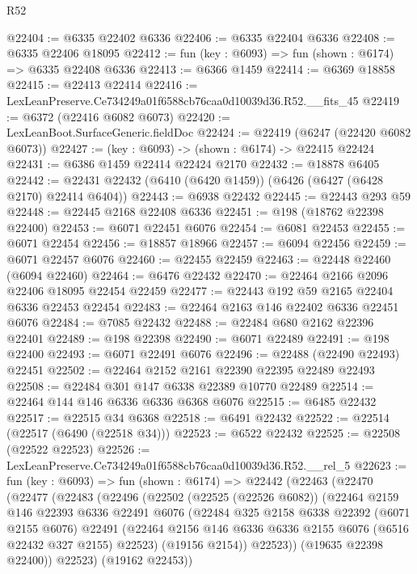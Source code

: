 \begin{lexlean}{R52}
\begin{coremodule}
@22404 := @6335 @22402 @6336
@22406 := @6335 @22404 @6336
@22408 := @6335 @22406 @18095
@22412 := fun (key : @6093) => fun (shown : @6174) => @6335 @22408 @6336
@22413 := @6366 @1459
@22414 := @6369 @18858
@22415 := @22413 @22414
@22416 := LexLeanPreserve.Ce734249a01f6588cb76caa0d10039d36.R52.__fits_45
@22419 := @6372 (@22416 @6082 @6073)
@22420 := LexLeanBoot.SurfaceGeneric.fieldDoc
@22424 := @22419 (@6247 (@22420 @6082 @6073))
@22427 := (key : @6093) -> (shown : @6174) -> @22415 @22424
@22431 := @6386 @1459 @22414 @22424 @2170
@22432 := @18878 @6405
@22442 := @22431 @22432 (@6410 (@6420 @1459)) (@6426 (@6427 (@6428 @2170) @22414 @6404))
@22443 := @6938 @22432
@22445 := @22443 @293 @59
@22448 := @22445 @2168 @22408 @6336
@22451 := @198 (@18762 @22398 @22400)
@22453 := @6071 @22451 @6076
@22454 := @6081 @22453
@22455 := @6071 @22454
@22456 := @18857 @18966
@22457 := @6094 @22456
@22459 := @6071 @22457 @6076
@22460 := @22455 @22459
@22463 := @22448 @22460 (@6094 @22460)
@22464 := @6476 @22432
@22470 := @22464 @2166 @2096 @22406 @18095 @22454 @22459
@22477 := @22443 @192 @59 @2165 @22404 @6336 @22453 @22454
@22483 := @22464 @2163 @146 @22402 @6336 @22451 @6076
@22484 := @7085 @22432
@22488 := @22484 @680 @2162 @22396 @22401
@22489 := @198 @22398
@22490 := @6071 @22489
@22491 := @198 @22400
@22493 := @6071 @22491 @6076
@22496 := @22488 (@22490 @22493) @22451
@22502 := @22464 @2152 @2161 @22390 @22395 @22489 @22493
@22508 := @22484 @301 @147 @6338 @22389 @10770 @22489
@22514 := @22464 @144 @146 @6336 @6336 @6368 @6076
@22515 := @6485 @22432
@22517 := @22515 @34 @6368
@22518 := @6491 @22432
@22522 := @22514 (@22517 (@6490 (@22518 @34)))
@22523 := @6522 @22432
@22525 := @22508 (@22522 @22523)
@22526 := LexLeanPreserve.Ce734249a01f6588cb76caa0d10039d36.R52.__rel_5
@22623 := fun (key : @6093) =>
  fun (shown : @6174) =>
  @22442
    (@22463
      (@22470
        (@22477
          (@22483
            (@22496
              (@22502
                (@22525 (@22526 @6082))
                (@22464
                  @2159
                  @146
                  @22393
                  @6336
                  @22491
                  @6076
                  (@22484
                    @325
                    @2158
                    @6338
                    @22392
                    (@6071 @2155 @6076)
                    @22491
                    (@22464 @2156 @146 @6336 @6336 @2155 @6076 (@6516 @22432 @327 @2155) @22523)
                    (@19156 @2154))
                  @22523))
              (@19635 @22398 @22400))
            @22523)
          (@19162 @22453))

\end{coremodule}
\end{lexlean}
